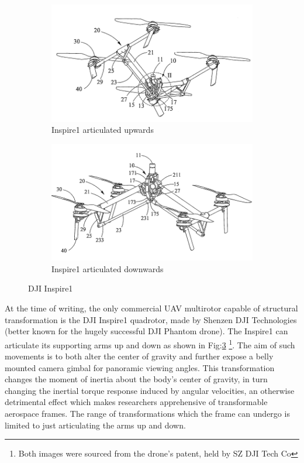 \begin{figure}[hbtp]
\centering
\begin{subfigure}{.5\textwidth}
\centering
\includegraphics[width=\textwidth]{figs/dji-inspire1}
\caption{Inspire1 articulated upwards}
\label{fig:inspireup}
\end{subfigure}%
\begin{subfigure}{.5\textwidth}
\centering
\includegraphics[width=\textwidth]{figs/dji-inspire2}
\caption{Inspire1 articulated downwards}
\label{fig:inspiredown}
\end{subfigure}
\caption{DJI Inspire1}
\label{fig:inspire1}
\end{figure}
At the time of writing, the only commercial UAV multirotor capable of structural transformation is the DJI Inspire1 quadrotor\cite{inspire}, made by Shenzen DJI Technologies (better known for the hugely successful DJI Phantom drone\cite{phantom}). The Inspire1 can articulate its supporting arms up and down as shown in Fig:\ref{fig:inspire1} \footnote{Both images were sourced from the drone's patent, held by SZ DJI Tech Co\cite{djinspire}}. The aim of such movements is to both alter the center of gravity and further expose a belly mounted camera gimbal for panoramic viewing angles. This transformation changes the moment of inertia about the body's center of gravity, in turn changing the inertial torque response induced by angular velocities, an otherwise detrimental effect which makes researchers apprehensive of transformable aerospace frames. The range of transformations which the frame can undergo is limited to just articulating the arms up and down.
